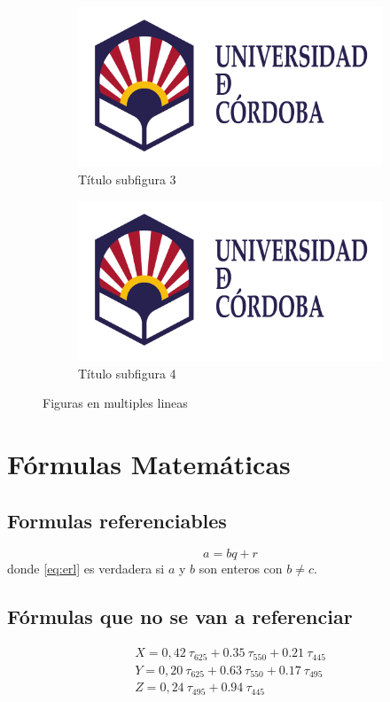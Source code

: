 \begin{figure}[H]
\begin{subfigure}{.5\textwidth}
  \centering
  \includegraphics[width=.8\linewidth]{Imagenes/logo_uco}  
  \caption{Título subfigura 3}
  \label{fig:sub-first}
\end{subfigure}
\begin{subfigure}{.5\textwidth}
  \centering
  \includegraphics[width=.8\linewidth]{Imagenes/logo_uco}  
  \caption{Título subfigura 4}
  \label{fig:sub-second}
\end{subfigure}

\caption{Figuras en multiples lineas}
\label{figT:subfiguras2}
\end{figure}


\section{Fórmulas Matemáticas}

\subsection{Formulas referenciables}
\begin{equation} \label{eq:erl} a = bq + r \end{equation} donde \eqref{eq:erl} es verdadera si $a$ y $b$ son enteros con $b \neq c$. 

\subsection{Fórmulas que no se van a referenciar}
\begin{align*} 
X = 0,42 \ \tau_{625} + 0.35 \ \tau_{550} + 0.21 \ \tau_{445} \\
Y = 0,20 \ \tau_{625} + 0.63 \ \tau_{550} + 0.17 \ \tau_{495} \\
Z = 0,24 \ \tau_{495} + 0.94 \ \tau_{445} 
\end{align*}

